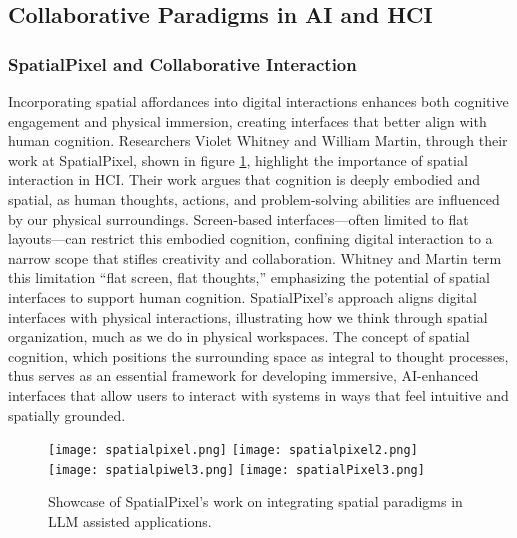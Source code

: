 \subsection{Collaborative Paradigms in AI and HCI}

\subsubsection{SpatialPixel and Collaborative Interaction}

Incorporating spatial affordances into digital interactions enhances both cognitive engagement and physical immersion, creating interfaces that better align with human cognition\cite{Kaptelinin2006ActingWT}.
Researchers Violet Whitney and William Martin, through their work at SpatialPixel, shown in figure \ref{fig:spatialpixel}, highlight the importance of spatial interaction in HCI.
Their work argues that cognition is deeply embodied and spatial, as human thoughts, actions, and problem-solving abilities are influenced by our physical surroundings.
Screen-based interfaces—often limited to flat layouts—can restrict this embodied cognition, confining digital interaction to a narrow scope that stifles creativity and collaboration.
Whitney and Martin term this limitation “flat screen, flat thoughts,”\cite{whitney2024} emphasizing the potential of spatial interfaces to support human cognition. 
SpatialPixel’s approach aligns digital interfaces with physical interactions, illustrating how we think through spatial organization, much as we do in physical workspaces\cite{andy1998extended}.
The concept of spatial cognition\cite{Nardi1995ContextAC}, which positions the surrounding space as integral to thought processes, thus serves as an essential framework for developing immersive, AI-enhanced interfaces that allow users to interact with systems in ways that feel intuitive and spatially grounded.

\begin{figure}[!h]
    \centering
    \texttt{[image: spatialpixel.png]}
    \texttt{[image: spatialpixel2.png]}
    \texttt{[image: spatialpiwel3.png]}
    \texttt{[image: spatialPixel3.png]}
    \caption{Showcase of SpatialPixel's work on integrating spatial paradigms in LLM assisted applications.}
    \vspace{0.1cm}
    \label{fig:spatialpixel}
\end{figure}

